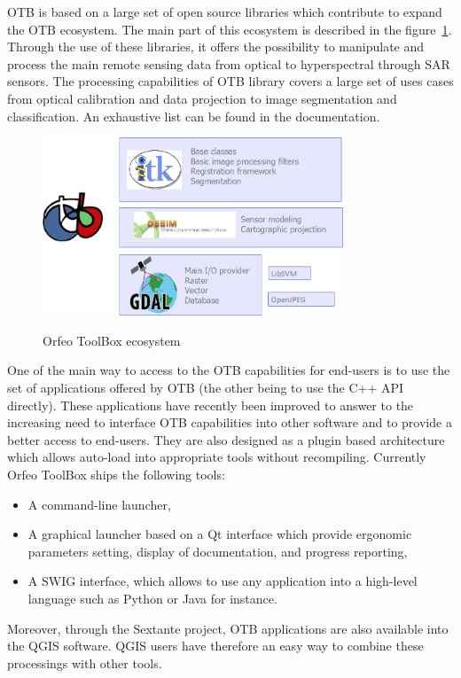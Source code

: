 \documentclass{josis}
\begin{document}
OTB is based on a large set of open source libraries which contribute
to expand the OTB ecosystem. The main part of this ecosystem is
described in the figure~\ref{fig:ecosystem}. Through the use of these
libraries, it offers the possibility to manipulate and process the
main remote sensing data from optical to hyperspectral through SAR
sensors. The processing capabilities of OTB library covers a large set
of uses cases from optical calibration and data projection to image
segmentation and classification. An exhaustive list can be found in
the documentation.

\begin{figure}[!htb]
\centering
\includegraphics[width=0.8\textwidth]{Pictures/otb_ecosystem}\label{fig:ecosystem}
\caption{Orfeo ToolBox ecosystem}
\end{figure}

One of the main way to access to the OTB capabilities for end-users is
to use the set of applications offered by OTB (the other being to use
the C++ API directly). These applications have recently been
improved to answer to the increasing need to interface OTB
capabilities into other software and to provide a better access to
end-users. They are also designed as a plugin based architecture which allows auto-load into
appropriate tools without recompiling. Currently
Orfeo ToolBox ships the following tools:
\begin{itemize}
\item A command-line launcher,
\item A graphical launcher based on a Qt interface which provide
  ergonomic parameters setting, display of documentation, and progress
  reporting,
\item A SWIG interface, which allows to use any application into a
  high-level language such as Python or Java for instance.
\end{itemize}
Moreover, through the Sextante project, OTB applications are also
available into the QGIS software. QGIS users have therefore an easy
way to combine these processings with other tools.
\end{document}
